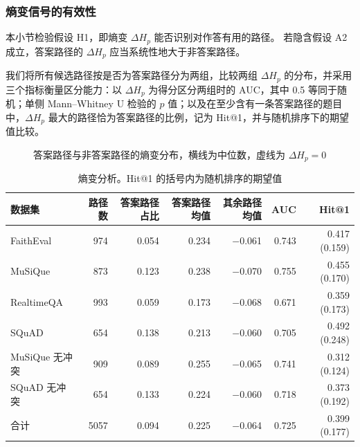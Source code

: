 
\subsubsection{熵变信号的有效性}
\label{sec:cl-e1}

本小节检验假设 H1，即熵变 $\Delta H_p$ 能否识别对作答有用的路径。
若隐含假设 A2 成立，答案路径的 $\Delta H_p$ 应当系统性地大于非答案路径。

我们将所有候选路径按是否为答案路径分为两组，比较两组 $\Delta H_p$ 的分布，并采用三个指标衡量区分能力：以 $\Delta H_p$ 为得分区分两组时的 AUC，其中 0.5 等同于随机；单侧 Mann--Whitney U 检验的 $p$ 值；以及在至少含有一条答案路径的题目中，$\Delta H_p$ 最大的路径恰为答案路径的比例，记为 Hit@1，并与随机排序下的期望值比较。

\begin{figure}[htbp]
  \centering
  \caption{答案路径与非答案路径的熵变分布，横线为中位数，虚线为 $\Delta H_p=0$}
  \label{fig:cl-e1}
\end{figure}

\begin{table}[htbp]
  \centering
  \small
  \renewcommand{\arraystretch}{1.3}
  \caption{熵变分析。Hit@1 的括号内为随机排序的期望值}
  \label{tab:cl-e1}
  \begin{tabular}{lrrrrrr}
    \toprule
    数据集 & 路径数 & 答案路径占比 & 答案路径均值 & 其余路径均值 & AUC & Hit@1 \\
    \midrule
    FaithEval    &  974 & 0.054 & 0.234 & $-$0.061 & 0.743 & 0.417 (0.159) \\
    MuSiQue      &  873 & 0.123 & 0.238 & $-$0.070 & 0.755 & 0.455 (0.170) \\
    RealtimeQA   &  993 & 0.059 & 0.173 & $-$0.068 & 0.671 & 0.359 (0.173) \\
    SQuAD        &  654 & 0.138 & 0.213 & $-$0.060 & 0.705 & 0.492 (0.248) \\
    MuSiQue 无冲突 &  909 & 0.089 & 0.255 & $-$0.065 & 0.741 & 0.312 (0.124) \\
    SQuAD 无冲突   &  654 & 0.133 & 0.224 & $-$0.060 & 0.718 & 0.373 (0.192) \\
    合计         & 5057 & 0.094 & 0.225 & $-$0.064 & 0.725 & 0.399 (0.177) \\
    \bottomrule
  \end{tabular}
\end{table}

